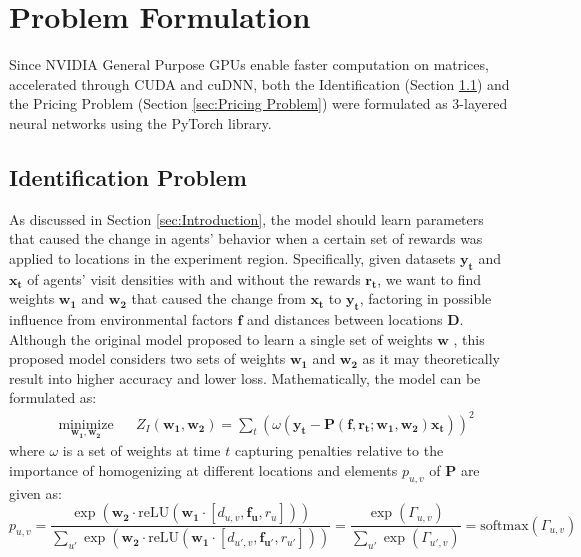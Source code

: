 \documentclass[12pt]{article}
\newcommand{\vect}[1]{\mathbf{#1}}  %
\newcommand{\matr}[1]{\mathbf{#1}}  %
\begin{document}
    \section{Problem Formulation} \label{sec:Problem Formulation}
    Since NVIDIA General Purpose GPUs enable faster computation on matrices, accelerated through CUDA and cuDNN, both the Identification (Section \ref{sec:Identification Problem}) and the Pricing Problem (Section \ref{sec:Pricing Problem}) were formulated as 3-layered neural networks using the PyTorch library.
    
    \subsection{Identification Problem} \label{sec:Identification Problem}
    As discussed in Section \ref{sec:Introduction}, the model should learn parameters that caused the change in agents' behavior when a certain set of rewards was applied to locations in the experiment region. Specifically, given datasets $\vect{y_t}$ and $\vect{x_t}$ of agents' visit densities with and without the rewards $\vect{r_t}$, we want to find weights $\matr{w_1}$ and $\matr{w_2}$ that caused the change from $\vect{x_t}$ to $\vect{y_t}$, factoring in possible influence from environmental factors $\matr{f}$ and distances between locations $\matr{D}$. Although the original model proposed to learn a single set of weights $\matr{w}$ \cite{Xue2016Avi2}, this proposed model considers two sets of weights $\matr{w_1}$ and $\matr{w_2}$ as it may theoretically result into higher accuracy and lower loss. Mathematically, the model can be formulated as:
    \begin{equation} \label{eq:iden_problem}
    \begin{aligned}
    & \underset{\matr{w_1}, \matr{w_2}}{\text{minimize}}
    & & Z_I(\matr{w_1}, \matr{w_2}) = \sum_{t} (\omega(\vect{y_t} - \matr{P}(\matr{f}, \vect{r_t}; \matr{w_1}, \matr{w_2})\vect{x_t}))^{2}
    \end{aligned}
    \end{equation}
    where $\omega$ is a set of weights at time $t$ capturing penalties relative to the importance of homogenizing at different locations and elements $p_{u, v}$ of $\matr{P}$ are given as:
    \begin{equation} \label{eq:puv_equation}
    p_{u, v} = \frac{\exp(\matr{w_2} \cdot \text{reLU} (\matr{w_1} \cdot [d_{u, v}, \vect{f_{u}}, r_{u}]))}{\sum_{u'} \exp(\matr{w_2} \cdot \text{reLU} (\matr{w_1} \cdot [d_{u', v}, \vect{f_{u'}}, r_{u'}]))} = \frac{\exp(\Gamma_{u, v})}{\sum_{u'}\exp(\Gamma_{u', v})} = \text{softmax}(\Gamma_{u, v})
    \end{equation}
\end{document}
